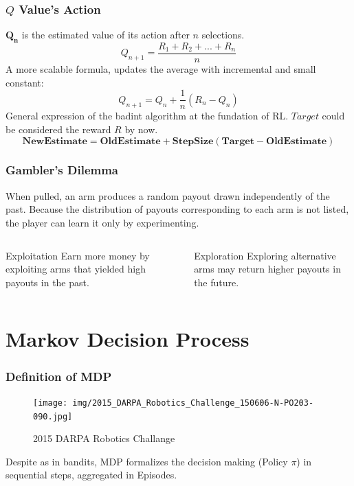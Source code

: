 \documentclass[10pt]{beamer}
\begin{document}
\begin{frame}
	\frametitle{\begin{math} Q \end{math} Value's Action}
	\begin{math} \mathbf{Q_n} \end{math} is the estimated value of its action after $ n $ selections.	
	$$ Q_{n+1} = \frac{R_1 +R_2 + ... +R_{n}}{n} $$
	A more scalable formula, updates the average with incremental and small constant:
	$$ Q_{n+1} = Q_n + \frac{1}{n}(R_n-Q_n)$$
	General expression of the badint algorithm at the fundation of RL. \begin{math}Target\end{math} could be considered the reward $ R $ by now.
	$$ \mathbf{NewEstimate = OldEstimate + StepSize(Target-OldEstimate)}$$
\end{frame}

\begin{frame}
\frametitle{Gambler's Dilemma}
When pulled, an arm produces a random payout drawn independently of the past. Because the distribution of payouts corresponding to each arm is not listed, the player can learn it only by experimenting.
	\begin{columns}
		\begin{column}{0.5\textwidth}
			\begin{alertblock}{Exploitation}
		Earn more money by exploiting arms that yielded high payouts in the past.
			\end{alertblock}
		\end{column}
		\begin{column}{0.5\textwidth}  %
			\begin{alertblock}{Exploration}
		Exploring alternative arms may return higher payouts in the future.
			\end{alertblock}
		\end{column}
	\end{columns}
\end{frame}

\section{Markov Decision Process}
\begin{frame}
	\frametitle{Definition of MDP}
	\begin{figure}
		\texttt{[image: img/2015\_DARPA\_Robotics\_Challenge\_150606-N-PO203-090.jpg]}	
		\caption{2015 DARPA Robotics Challange \cite{mdp-robot}}
	\end{figure}
	Despite as in bandits, MDP formalizes the decision making (Policy $\pi$) in sequential steps, aggregated in Episodes. 
\end{frame}
\end{document}
